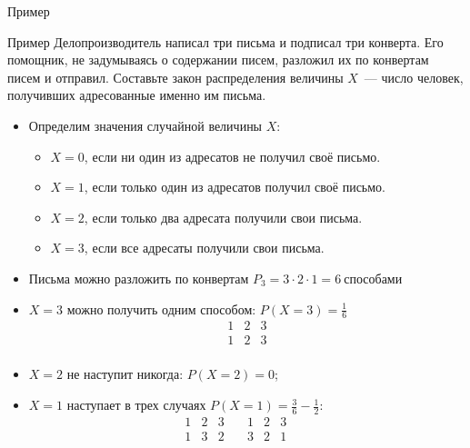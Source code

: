 \documentclass[unicode,11pt,notheorems,xcolor=table]{beamer}
\begin{document}
\begin{frame}[allowframebreaks]{Пример}{}
    \begin{exampleblock}{Пример}
        Делопроизводитель написал три письма и подписал три конверта. 
        Его помощник, не задумываясь о содержании писем, разложил их по конвертам  писем и отправил.
        Составьте закон распределения величины $X$~--- число человек, получивших адресованные именно им письма.
    \end{exampleblock}
    \begin{itemize}
        \item Определим значения случайной величины $X$:
        \begin{itemize}
            \item $X = 0$, если ни один из адресатов не получил своё письмо.
            \item $X = 1$, если только один из адресатов получил своё письмо.
            \item $X = 2$, если только два адресата получили свои письма.
            \item $X = 3$, если все адресаты получили свои письма.
        \end{itemize}
        \item Письма можно разложить по конвертам
        $P_3 = 3\cdot 2 \cdot 1 = 6~\text{способами}$
        \item  $X=3$ можно получить одним способом: $P(X=3)=\frac{1}{6}$
        $$
        \begin{array}{c|c|c}
            1 & 2& 3\\
            \hline
            1 & 2& 3\\
        \end{array}
        $$
        \item  $X=2$ не наступит никогда: $P(X=2)=0$;
        \item  $X=1$ наступает в трех случаях $P(X=1)=\frac{3}{6}-\frac{1}{2}$:
        $$
        \begin{array}{c|c|c}
            1 & 2& 3\\
            \hline
            1 & 3& 2\\
        \end{array}
        \quad
        \begin{array}{c|c|c}
            1 & 2& 3\\
            \hline
            3 & 2& 1\\
        \end{array}
        \quad
        \begin{array}{c|c|c}

\end{array}$$
\end{itemize}
\end{frame}
\end{document}
